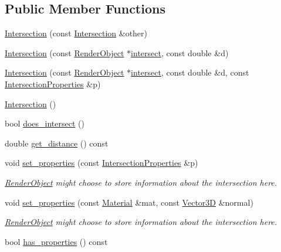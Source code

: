 \subsection*{Public Member Functions}
\begin{DoxyCompactItemize}
\item 
\hyperlink{classIntersection_a6d6042fc104b258908c3c55d7cc23aa3}{Intersection} (const \hyperlink{classIntersection}{Intersection} \&other)
\item 
\hyperlink{classIntersection_accfff54844dea1b64fce8ddb1c72f84d}{Intersection} (const \hyperlink{classRenderObject}{Render\+Object} $\ast$\hyperlink{classIntersection_a8241676dd0f240769dc189132dc3c5bb}{intersect}, const double \&d)
\item 
\hyperlink{classIntersection_a8c9336839207202dbd7cc8eef633272e}{Intersection} (const \hyperlink{classRenderObject}{Render\+Object} $\ast$\hyperlink{classIntersection_a8241676dd0f240769dc189132dc3c5bb}{intersect}, const double \&d, const \hyperlink{classIntersectionProperties}{Intersection\+Properties} \&p)
\item 
\hyperlink{classIntersection_a67497e3efe2793b23909052eeb82c4f3}{Intersection} ()
\item 
bool \hyperlink{classIntersection_ae2d6edc03a6a048258724c2ca7ca2dc8}{does\+\_\+intersect} ()
\item 
double \hyperlink{classIntersection_a3ebb19b50063f6034a36a1d59ae2f483}{get\+\_\+distance} () const 
\item 
void \hyperlink{classIntersection_afeb53190b4cae138c2ab89b8b7198481}{set\+\_\+properties} (const \hyperlink{classIntersectionProperties}{Intersection\+Properties} \&p)
\begin{DoxyCompactList}\small\item\em \hyperlink{classRenderObject}{Render\+Object} might choose to store information about the intersection here. \end{DoxyCompactList}\item 
void \hyperlink{classIntersection_aa5b98f38c76a5b3fb869b89ddc77f2da}{set\+\_\+properties} (const \hyperlink{classMaterial}{Material} \&mat, const \hyperlink{classVector3D}{Vector3D} \&normal)
\begin{DoxyCompactList}\small\item\em \hyperlink{classRenderObject}{Render\+Object} might choose to store information about the intersection here. \end{DoxyCompactList}\item 
bool \hyperlink{classIntersection_a5315f78b43c5ec261497bf87003d0613}{has\+\_\+properties} () const 

\end{DoxyCompactItemize}
